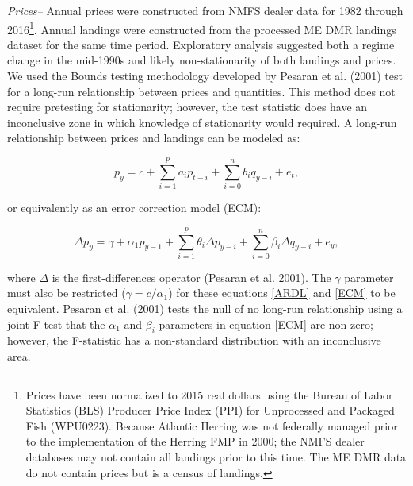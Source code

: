 \documentclass[]{article}
\let\rmarkdownfootnote\footnote%
\def\footnote{\protect\rmarkdownfootnote}
\begin{document}
\emph{Prices--} Annual prices were constructed from NMFS dealer data for
1982 through 2016\footnote{Prices have been normalized to 2015 real
  dollars using the Bureau of Labor Statistics (BLS) Producer Price
  Index (PPI) for Unprocessed and Packaged Fish (WPU0223). Because
  Atlantic Herring was not federally managed prior to the implementation
  of the Herring FMP in 2000; the NMFS dealer databases may not contain
  all landings prior to this time. The ME DMR data do not contain prices
  but is a census of landings.}. Annual landings were constructed from
the processed ME DMR landings dataset for the same time period.
Exploratory analysis suggested both a regime change in the mid-1990s and
likely non-stationarity of both landings and prices. We used the Bounds
testing methodology developed by Pesaran et al. (2001) test for a
long-run relationship between prices and quantities. This method does
not require pretesting for stationarity; however, the test statistic
does have an inconclusive zone in which knowledge of stationarity would
required. A long-run relationship between prices and landings can be
modeled as:

\begin{equation}
\label{ARDL}
p_{y}= c+\sum_{i=1}^p a_i p_{t-i}+ \sum_{i=0}^n b_i q_{y-i} + e_{t},
\end{equation}

or equivalently as an error correction model (ECM):

\begin{equation}
\label{ECM}
\Delta p_y= \gamma+ \alpha_1 p_{y-1} + \sum_{i=1}^p \theta_i \Delta p_{y-i}+ \sum_{i=0}^n  \beta_i \Delta q_{y-i} + e_{y},
\end{equation}

where \(\Delta\) is the first-differences operator (Pesaran et al.
2001). The \(\gamma\) parameter must also be restricted
(\(\gamma=c / \alpha_1\)) for these equations \ref{ARDL} and \ref{ECM}
to be equivalent. Pesaran et al. (2001) tests the null of no long-run
relationship using a joint F-test that the \(\alpha_1\) and \(\beta_i\)
parameters in equation \ref{ECM} are non-zero; however, the F-statistic
has a non-standard distribution with an inconclusive area.
\end{document}
